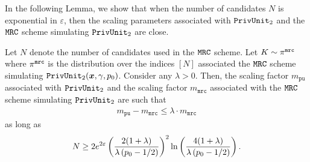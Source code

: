 In the following Lemma, we show that when the number of candidates $N$ is exponential in $\varepsilon$, then the scaling parameters associated with $\texttt{PrivUnit}_2$ and the $\texttt{MRC}$ scheme simulating $\texttt{PrivUnit}_2$ are close.
\begin{lemma}\label{lemma:mrc_privunit_approximation_error}
Let $N$ denote the number of candidates used in the \emph{$\texttt{MRC}$} scheme. Let $K \sim \pi^{\texttt{mrc}}$ where $\pi^{\texttt{mrc}}$ is the distribution over the indices $[N]$ associated the \emph{$\texttt{MRC}$} scheme simulating \emph{$\texttt{PrivUnit}_2({\boldsymbol{x}},\gamma, p_0)$}. Consider any $\lambda > 0$.
Then, the scaling factor $m_{\texttt{pu}}$ associated with \emph{$\texttt{PrivUnit}_2$} and the scaling factor $m_\texttt{mrc}$ associated with the \emph{$\texttt{MRC}$} scheme simulating \emph{$\texttt{PrivUnit}_2$} are such that
\begin{align}
    m_{\texttt{pu}} - m_\texttt{mrc} \leq \lambda\cdot m_\texttt{mrc}
\end{align}
as long as
\begin{align}
    N \geq   2e^{2\varepsilon}\left(\frac{2 (1+\lambda)}{\lambda \left( p_0 -1/2 \right)}\right)^2 \ln\left( \frac{4(1+\lambda)}{\lambda \left( p_0 -1/2 \right)} \right).
\end{align}
\end{lemma}

